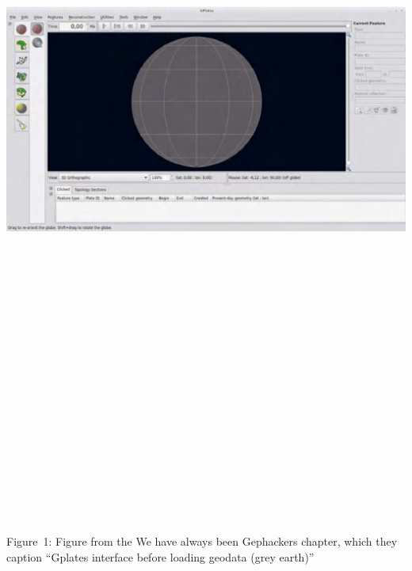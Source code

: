 \includegraphics[width=18.65278in,height=10.52778in]{../../Chapters/media_03_Disobedient_Action_Research_Cycles/Pictures/0.png}

Figure~1: Figure from the We have always been Gephackers chapter, which
they caption ``Gplates interface before loading geodata (grey earth)''

